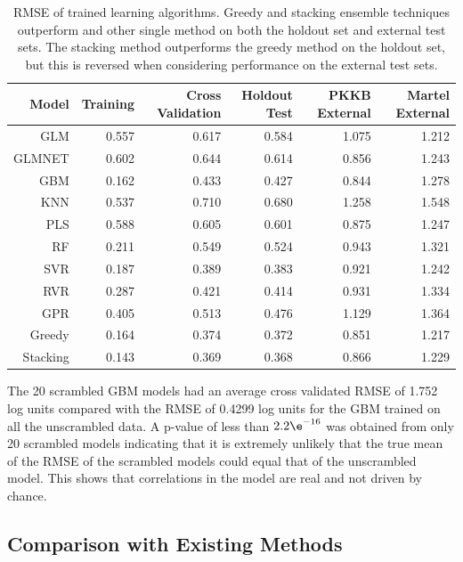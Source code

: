 \documentclass[10pt]{bmc_article}
\newenvironment{bmcformat}{\begin{raggedright}\baselineskip20pt\sloppy\setboolean{publ}{false}}{\end{raggedright}\baselineskip20pt\sloppy}
\begin{document}
\begin{bmcformat}
\begin{table}[htbp]
  \centering
  \caption{RMSE of trained learning algorithms. Greedy and stacking ensemble techniques outperform and other single method on both the holdout set and external test sets. The stacking method outperforms the greedy method on the holdout set, but this is reversed when considering performance on the external test sets.}
    \begin{tabular}{rrrrrr}
    \toprule
    Model & Training & Cross Validation & Holdout Test & PKKB External & Martel External \\
    \midrule
    GLM   & 0.557 & 0.617 & 0.584 & 1.075 & 1.212 \\
    GLMNET & 0.602 & 0.644 & 0.614 & 0.856 & 1.243 \\
    GBM   & 0.162 & 0.433 & 0.427 & 0.844 & 1.278 \\
    KNN   & 0.537 & 0.710 & 0.680 & 1.258 & 1.548 \\
    PLS   & 0.588 & 0.605 & 0.601 & 0.875 & 1.247 \\
    RF    & 0.211 & 0.549 & 0.524 & 0.943 & 1.321 \\
    SVR   & 0.187 & 0.389 & 0.383 & 0.921 & 1.242 \\
    RVR   & 0.287 & 0.421 & 0.414 & 0.931 & 1.334 \\
    GPR   & 0.405 & 0.513 & 0.476 & 1.129 & 1.364 \\
    Greedy & 0.164 & 0.374 & 0.372 & 0.851 & 1.217 \\
    Stacking & 0.143 & 0.369 & 0.368 & 0.866 & 1.229 \\
    \bottomrule
    \end{tabular}
  \label{tab:comparison}
\end{table}

The 20 scrambled GBM models had an average cross validated RMSE of 1.752 log units compared with the RMSE of 0.4299 log units for the GBM trained on all the unscrambled data. A p-value of less than $2.2\e^{-16}$ was obtained from only 20 scrambled models indicating that it is extremely unlikely that the true mean of the RMSE of the scrambled models could equal that of the unscrambled model. This shows that correlations in the model are real and not driven by chance.     

\subsection*{Comparison with Existing Methods}


\end{bmcformat}
\end{document}
